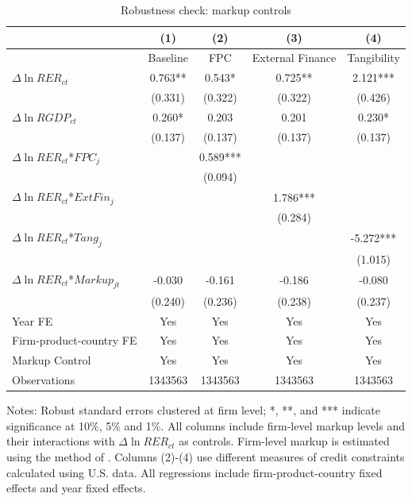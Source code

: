 \begin{table}[H]
	\centering
	\caption{Robustness check: markup controls}
	\begin{threeparttable}
		\begin{tabular}{lcccc}
			\toprule         
			& (1)   & (2)   & (3)   & (4)     \\
			\midrule
			& Baseline & FPC & External Finance & Tangibility\\
			\midrule
			$\Delta \ln RER_{ct}$ & 0.763** & 0.543* & 0.725** & 2.121*** \\
			& (0.331) & (0.322) & (0.322) & (0.426) \\
			$\Delta \ln RGDP_{ct}$ & 0.260*	& 0.203 & 0.201 & 0.230*\\
			& (0.137) & (0.137) & (0.137) & (0.137)  \\
			$\Delta \ln RER_{ct}$*$FPC_{j}$ &   & 0.589*** &       &  \\
			&   & (0.094) &       &  \\
			$\Delta \ln RER_{ct}$*$ExtFin_{j}$ &     &       & 1.786*** &  \\
			&   &       & (0.284) &  \\
			$\Delta \ln RER_{ct}$*$Tang_{j}$  &     &       &       & -5.272*** \\
			&    &       &       & (1.015) \\
                $\Delta \ln RER_{ct}$*$Markup_{jt}$ &  -0.030 & -0.161 & -0.186 & -0.080 \\
			&   (0.240) & (0.236) & (0.238) & (0.237) \\
			Year FE  & Yes   & Yes   & Yes   & Yes       \\
			Firm-product-country FE & Yes   & Yes   & Yes   & Yes       \\
			Markup Control & Yes   & Yes   & Yes   & Yes       \\
			Observations & 1343563 & 1343563 & 1343563 & 1343563  \\
			\bottomrule
		\end{tabular}
		\begin{tablenotes}
			\footnotesize
			\item Notes: Robust standard errors clustered at firm level; *, **, and *** indicate significance at 10\%, 5\% and 1\%. All columns include firm-level markup levels and their interactions with $\Delta \ln RER_{ct}$ as controls. Firm-level markup is estimated using the method of \cite{dlw2012}. Columns (2)-(4) use different measures of credit constraints calculated using U.S. data. All regressions include firm-product-country fixed effects and year fixed effects.
		\end{tablenotes}
	\end{threeparttable}
        \label{tab.markup}
\end{table}

